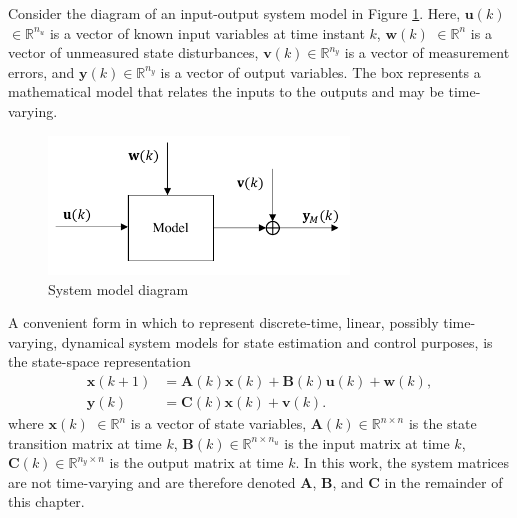 Consider the diagram of an input-output system model in Figure \ref{fig:model_diag_uwvy}. Here, $\mathbf{u}(k)$ $\in \mathbb{R}^{n_u}$ is a vector of known input variables at time instant $k$, $\mathbf{w}(k)$ $\in \mathbb{R}^n$ is a vector of unmeasured state disturbances, $\mathbf{v}(k) \in \mathbb{R}^{n_y}$ is a vector of measurement errors, and $\mathbf{y}(k) \in \mathbb{R}^{n_y}$ is a vector of output variables. The box represents a mathematical model that relates the inputs to the outputs and may be time-varying. 
%
%
%
%
\begin{figure}[ht]
	\centering
	\includegraphics[width=8cm]{images/model_diag_uwvy.pdf}
	\caption{System model diagram}
	\label{fig:model_diag_uwvy}
\end{figure}

A convenient form in which to represent discrete-time, linear, possibly time-varying, dynamical system models for state estimation and control purposes, is the state-space representation
\begin{equation} \label{eq:ss_rep_uwy}
	\begin{aligned}
		\mathbf{x}(k+1) &= \mathbf{A}(k) \mathbf{x}(k) + \mathbf{B}(k) \mathbf{u}(k) + \mathbf{w}(k), \\
		\mathbf{y}(k) &= \mathbf{C}(k) \mathbf{x}(k) + \mathbf{v}(k).
	\end{aligned}
\end{equation}
%
%
%
%
where $\mathbf{x}(k)$ $\in \mathbb{R}^n$ is a vector of state variables, $\mathbf{A}(k) \in \mathbb{R}^{n \times n}$ is the state transition matrix at time $k$, $\mathbf{B}(k) \in \mathbb{R}^{n \times n_u}$ is the input matrix at time $k$, $\mathbf{C}(k) \in \mathbb{R}^{n_y \times n}$ is the output matrix at time $k$. In this work, the system matrices are not time-varying and are therefore denoted $\mathbf{A}$, $\mathbf{B}$, and $\mathbf{C}$ in the remainder of this chapter.

